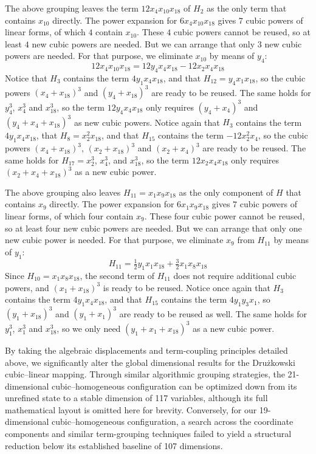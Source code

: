 \documentclass[11pt,a4paper]{article}
\begin{document}
The above grouping leaves the term $12 x_4 x_{10} x_{18}$ of $H_2$ as the only term that contains $x_{10}$ directly. The power expansion for $6 x_4 x_{10} x_{18}$ gives $7$ cubic powers of linear forms, of which $4$ contain $x_{10}$. These $4$ cubic powers cannot be reused, so at least $4$ new cubic powers are needed. But we can arrange that only $3$ new cubic powers are needed. For that purpose, we eliminate $x_{10}$ by means of $y_4$:
$$
12 x_4 x_{10} x_{18} = 12 y_4 x_4 x_{18} - 12 x_2 x_4 x_{18}
$$
Notice that $H_3$ contains the term $4 y_1 x_4 x_{18}$, and that $H_{12} = y_4 x_1 x_{18}$, so the cubic powers $(x_4 + x_{18})^3$ and $(y_4 + x_{18})^3$ are ready to be reused. The same holds for $y_4^3$, $x_4^3$ and $x_{18}^3$, so the term $12 y_4 x_4 x_{18}$ only requires $(y_4 + x_4)^3$ and $(y_4 + x_4 + x_{18})^3$ as new cubic powers. Notice again that $H_3$ contains the term $4 y_1 x_4 x_{18}$, that $H_8 = x_2^2 x_{18}$, and that $H_{15}$ contains the term $-12 x_2^2 x_4$, so the cubic powers $(x_4 + x_{18})^3$, $(x_2 + x_{18})^3$ and $(x_2 + x_4)^3$ are ready to be reused. The same holds for $H_{17} = x_2^3$, $x_4^3$, and $x_{18}^3$, so the term $12 x_2 x_4 x_{18}$ only requires $(x_2 + x_4 + x_{18})^3$ as a new cubic power.

The above grouping also leaves $H_{11} = x_1 x_9 x_{18}$ as the only component of $H$ that contains $x_9$ directly. The power expansion for $6 x_1 x_9 x_{18}$ gives $7$ cubic powers of linear forms, of which four contain $x_9$. These four cubic power cannot be reused, so at least four new cubic powers are needed. But we can arrange that only one new cubic power is needed. For that purpose, we eliminate $x_9$ from $H_{11}$ by means of $y_1$:
$$
H_{11} = \tfrac12 y_1 x_1 x_{18} + \tfrac32 x_1 x_8 x_{18}
$$
Since $H_{10} = x_1 x_8 x_{18}$, the second term of $H_{11}$ does not require additional cubic powers, and $(x_1 + x_{18})^3$ is ready to be reused. Notice once again that $H_3$ contains the term $4 y_1 x_4 x_{18}$, and that $H_{15}$ contains the term $4 y_1 y_3 x_1$, so $(y_1 + x_{18})^3$ and $(y_1 + x_1)^3$ are ready to be reused as well. The same holds for $y_1^3$, $x_1^3$ and $x_{18}^3$, so we only need $(y_1 + x_1 + x_{18})^3$ as a new cubic power.

By taking the algebraic displacements and term-coupling principles detailed above, we significantly alter the global dimensional results for the Drużkowski cubic--linear mapping. Through similar algorithmic grouping strategies, the 21-dimensional cubic--homogeneous configuration can be optimized down from its unrefined state to a stable dimension of 117 variables, although its full mathematical layout is omitted here for brevity. Conversely, for our 19-dimensional cubic--homogeneous configuration, a search across the coordinate components and similar term-grouping techniques failed to yield a structural reduction below its established baseline of 107 dimensions.
\end{document}

